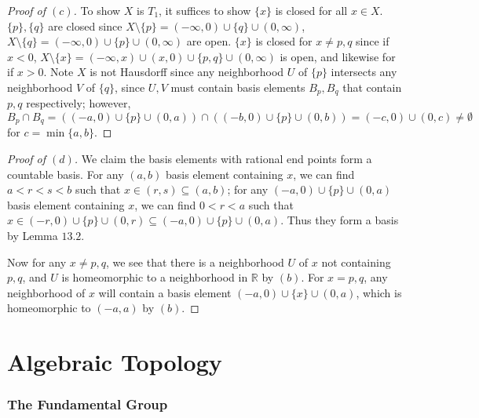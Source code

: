 \documentclass[12pt]{article}
\theoremstyle{remark}
\begin{document}
\begin{proof}[Proof of $(c)$]
  To show $X$ is $T_1$, it suffices to show $\{x\}$ is closed for all $x \in X$. $\{p\},\{q\}$ are closed since $X \setminus \{p\} = (-\infty,0) \cup \{q\} \cup (0,\infty)$, $X \setminus \{q\} = (-\infty,0) \cup \{p\} \cup (0,\infty)$ are open. $\{x\}$ is closed for $x \ne p,q$ since if $x < 0$, $X \setminus \{x\} = (-\infty,x) \cup (x,0) \cup \{p,q\} \cup (0,\infty)$ is open, and likewise for if $x > 0$. Note $X$ is not Hausdorff since any neighborhood $U$ of $\{p\}$ intersects any neighborhood $V$ of $\{q\}$, since $U,V$ must contain basis elements $B_p,B_q$ that contain $p,q$ respectively; however, $B_p \cap B_q = ((-a,0) \cup \{p\} \cup (0,a)) \cap ((-b,0) \cup \{p\} \cup (0,b)) = (-c,0) \cup (0,c) \ne \emptyset$ for $c = \min\{a,b\}$.
\end{proof}
\begin{proof}[Proof of $(d)$]
  We claim the basis elements with rational end points form a countable basis. For any $(a,b)$ basis element containing $x$, we can find $a < r < s < b$ such that $x \in (r,s) \subseteq (a,b)$; for any $(-a,0) \cup \{p\} \cup (0,a)$ basis element containing $x$, we can find $0 < r < a$ such that $x \in (-r,0) \cup \{p\} \cup (0,r) \subseteq (-a,0) \cup \{p\} \cup (0,a)$. Thus they form a basis by Lemma $13.2$.
  \par Now for any $x \ne p,q$, we see that there is a neighborhood $U$ of $x$ not containing $p,q$, and $U$ is homeomorphic to a neighborhood in $\mathbb{R}$ by $(b)$. For $x = p,q$, any neighborhood of $x$ will contain a basis element $(-a,0) \cup \{x\} \cup(0,a)$, which is homeomorphic to $(-a,a)$ by $(b)$.
\end{proof}

\part{Algebraic Topology}
\setcounter{section}{8}
\section{The Fundamental Group}
\setcounter{subsection}{50}
\end{document}
